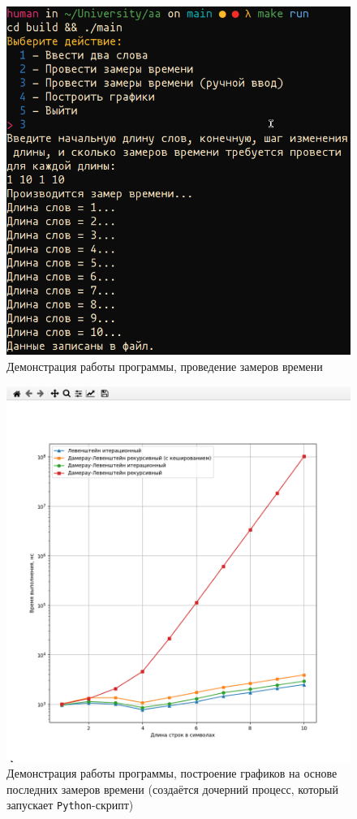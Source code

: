 \begin{figure}[H]
	\centering
	\includegraphics[scale=0.7]{img/demo2.png}
	\caption{Демонстрация работы программы, проведение замеров времени}
	\label{fig:demo2}
\end{figure}

\begin{figure}[H]
	\centering
	\includegraphics[scale=0.5]{img/demo3.png}
	\caption{Демонстрация работы программы, построение графиков на основе последних замеров времени (создаётся дочерний процесс, который запускает \texttt{Python}-скрипт)}
	\label{fig:demo3}
\end{figure}

